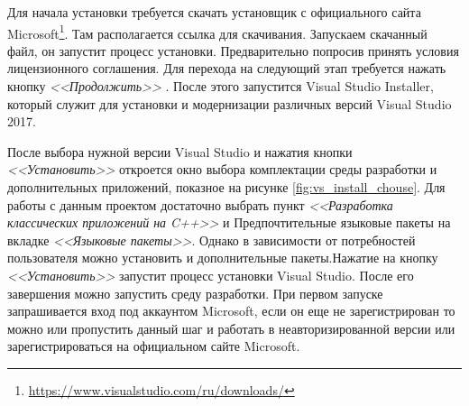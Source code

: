 Для начала установки требуется скачать установщик с официального сайта Microsoft\footnote{\url{https://www.visualstudio.com/ru/downloads/}}. Там располагается ссылка для скачивания. Запускаем скачанный файл, он запустит процесс установки. Предварительно попросив принять условия лицензионного соглашения. Для перехода на следующий этап требуется нажать кнопку \textit{<<Продолжить>>} . После этого запустится Visual Studio Installer, который служит для установки и модернизации различных версий Visual Studio 2017.


\begin{comment}
\begin{figure}
    \centering   
    \texttt{[image: vs\_install.JPG]} 
    \caption{Выбор требуемой версии Visual Studio}
    \label{fig:vs_install2}
\end{figure}

\begin{figure}[h]
    \centering
    \begin{subfigure}{0.45\textwidth}  
        \centering     
        \texttt{[image: vs\_download.JPG]}
        \caption{}
        \label{fig:vs_downolad}
    \end{subfigure}
    \begin{subfigure}{0.45\textwidth}  
        \centering
        \texttt{[image: vs\_licence.JPG]}
        \caption{}
        \label{fig:vs_licence}
    \end{subfigure}
    \caption{а -- Ссылка для загрузки установщика; б -- окно принятия лицензионного соглашения}
    \label{fig:vs_install1}
\end{figure}
\end{comment}
После выбора нужной версии Visual Studio и нажатия кнопки \textit{<<Установить>>} откроется окно выбора комплектации среды разработки и дополнительных приложений, показное на рисунке \ref{fig:vs_install_chouse}. Для работы с данным проектом достаточно выбрать пункт \textit{<<Разработка классических приложений на C++>>} и Предпочтительные языковые пакеты на вкладке \textit{<<Языковые пакеты>>}. Однако в зависимости от потребностей пользователя можно установить и дополнительные пакеты.Нажатие на кнопку \textit{<<Установить>>} запустит процесс установки Visual Studio.  После его завершения можно запустить среду разработки. При первом запуске запрашивается вход под аккаунтом Microsoft, если он еще не зарегистрирован то можно или пропустить данный шаг и работать в неавторизированной версии или зарегистрироваться на официальном сайте Microsoft.

